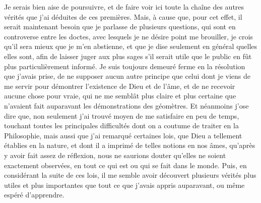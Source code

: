 \documentclass[french,twoside]{book} %
\newcommand\chaptercont{} %
\begin{document}
\chaptercont
\noindent Je serais bien aise de poursuivre, et de faire voir ici toute la chaîne des autres vérités que j'ai déduites de ces premières. Mais, à cause que, pour cet effet, il serait maintenant besoin que je parlasse de plusieurs questions, qui sont en controverse entre les doctes, avec lesquels je ne désire point me brouiller, je crois qu'il sera mieux que je m'en abstienne, et que je dise seulement en général quelles elles sont, afin de laisser juger aux plus sages s'il serait utile que le public en fût plus particulièrement informé. Je suis toujours demeuré ferme en la résolution que j'avais prise, de ne supposer aucun autre principe que celui dont je viens de me servir pour démontrer l'existence de Dieu et de l'âme, et de ne recevoir aucune chose pour vraie, qui ne me semblât plus claire et plus certaine que n'avaient fait auparavant les démonstrations des géomètres. Et néanmoins j'ose dire que, non seulement j'ai trouvé moyen de me satisfaire en peu de temps, touchant toutes les principales difficultés dont on a coutume de traiter en la Philosophie, mais aussi que j'ai remarqué certaines lois, que Dieu a tellement établies en la nature, et dont il a imprimé de telles notions en nos âmes, qu'après y avoir fait assez de réflexion, nous ne saurions douter qu'elles ne soient exactement observées, en tout ce qui est ou qui se fait dans le monde. Puis, en considérant la suite de ces lois, il me semble avoir découvert plusieurs vérités plus utiles et plus importantes que tout ce que j'avais appris auparavant, ou même espéré d'apprendre.\par
\end{document}
